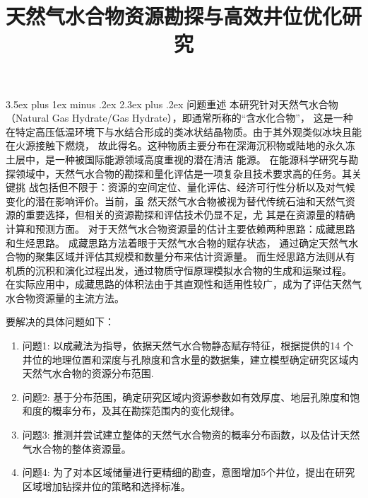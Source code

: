 \documentclass[12pt,a4paper]{nmmcm}
\title{{天然气水合物资源勘探与高效井位优化研究}}
\date{}
\makeatletter
\renewcommand\section{\@startsection{section}{1}{0pt}%
    {3.5ex plus 1ex minus .2ex}%
    {2.3ex plus .2ex}%
    {\normalfont\LARGE\bfseries}}
\makeatother
\begin{document}
\begin{abstract}
  

  \begin{keywords}
    {\song{}}
  \end{keywords}

\end{abstract}
\maketitle
\renewcommand{\contentsname}{\centerline{\sanhao\bfseries\HEI 目\quad 录}}
\tableofcontents

\newpage
\setcounter{page}{1}
\pagestyle{fancy}
\section{问题重述}
本研究针对天然气水合物（Natural Gas Hydrate/Gas Hydrate），即通常所称的“含水化合物”，
这是一种在特定高压低温环境下与水结合形成的类冰状结晶物质。由于其外观类似冰块且能在火源接触下燃烧，
故此得名。这种物质主要分布在深海沉积物或陆地的永久冻土层中，是一种被国际能源领域高度重视的潜在清洁
能源。
在能源科学研究与勘探领域中，天然气水合物的勘探和量化评估是一项复杂且技术要求高的任务。其关键挑
战包括但不限于：资源的空间定位、量化评估、经济可行性分析以及对气候变化的潜在影响评价。当前，虽
然天然气水合物被视为替代传统石油和天然气资源的重要选择，但相关的资源勘探和评估技术仍显不足，尤
其是在资源量的精确计算和预测方面。
对于天然气水合物资源量的估计主要依赖两种思路：成藏思路和生烃思路。
成藏思路方法着眼于天然气水合物的赋存状态，
通过确定天然气水合物的聚集区域并评估其规模和数量分布来估计资源量。
而生烃思路方法则从有机质的沉积和演化过程出发，通过物质守恒原理模拟水合物的生成和运聚过程。
在实际应用中，成藏思路的体积法由于其直观性和适用性较广，成为了评估天然气水合物资源量的主流方法。

要解决的具体问题如下：
\begin{enumerate}
  \item
        问题1: 以成藏法为指导，依据天然气水合物静态赋存特征，根据提供的14 个井位的地理位置和深度与孔隙度和含水量的数据集，建立模型确定研究区域内天然气水合物的资源分布范围.
  \item
        问题2: 基于分布范围，确定研究区域内资源参数如有效厚度、地层孔隙度和饱和度的概率分布，及其在勘探范围内的变化规律。
  \item
        问题3: 推测并尝试建立整体的天然气水合物资的概率分布函数，以及估计天然气水合物的整体资源量。
  \item
        问题4: 为了对本区域储量进行更精细的勘查，意图增加5个井位，提出在研究区域增加钻探井位的策略和选择标准。
\end{enumerate}
\end{document}
